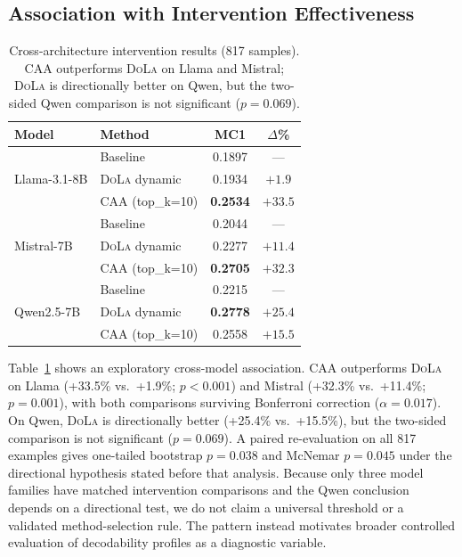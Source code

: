 \documentclass[11pt]{article}
\newcommand{\dola}{\textsc{DoLa}}
\newcommand{\caa}{\textsc{CAA}}
\begin{document}
\subsection{Association with Intervention Effectiveness}

\begin{table}[t]
\centering
\small
\begin{tabular}{llcc}
\toprule
\textbf{Model} & \textbf{Method} & \textbf{MC1} & \textbf{$\Delta$\%} \\
\midrule
\multirow{3}{*}{Llama-3.1-8B} & Baseline & 0.1897 & --- \\
 & \dola{} dynamic & 0.1934 & $+1.9$ \\
 & \caa{} (top\_k=10) & \textbf{0.2534} & $\mathbf{+33.5}$ \\
\midrule
\multirow{3}{*}{Mistral-7B} & Baseline & 0.2044 & --- \\
 & \dola{} dynamic & 0.2277 & $+11.4$ \\
 & \caa{} (top\_k=10) & \textbf{0.2705} & $\mathbf{+32.3}$ \\
\midrule
\multirow{3}{*}{Qwen2.5-7B} & Baseline & 0.2215 & --- \\
 & \dola{} dynamic & \textbf{0.2778} & $\mathbf{+25.4}$ \\
 & \caa{} (top\_k=10) & 0.2558 & $+15.5$ \\
\bottomrule
\end{tabular}
\caption{Cross-architecture intervention results (817 samples). \caa{} outperforms \dola{} on Llama and Mistral; \dola{} is directionally better on Qwen, but the two-sided Qwen comparison is not significant ($p{=}0.069$).}
\label{tab:cross_interventions}
\end{table}

Table~\ref{tab:cross_interventions} shows an exploratory cross-model association. \caa{} outperforms \dola{} on Llama (+33.5\% vs.\ +1.9\%; $p{<}0.001$) and Mistral (+32.3\% vs.\ +11.4\%; $p{=}0.001$), with both comparisons surviving Bonferroni correction ($\alpha{=}0.017$). On Qwen, \dola{} is directionally better (+25.4\% vs.\ +15.5\%), but the two-sided comparison is not significant ($p{=}0.069$). A paired re-evaluation on all 817 examples gives one-tailed bootstrap $p{=}0.038$ and McNemar $p{=}0.045$ under the directional hypothesis stated before that analysis. Because only three model families have matched intervention comparisons and the Qwen conclusion depends on a directional test, we do not claim a universal threshold or a validated method-selection rule. The pattern instead motivates broader controlled evaluation of decodability profiles as a diagnostic variable.
\end{document}
